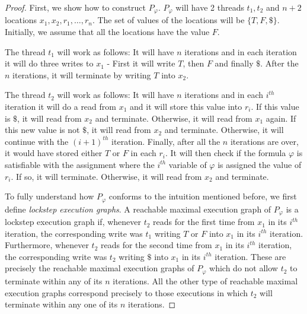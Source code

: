 \documentclass[acmsmall]{acmart}
\begin{document}
\begin{proof}
    First, we show how to construct $P_\varphi$. $P_\varphi$ will have 2 threads $t_1, t_2$
    and $n+2$ locations $x_1,x_2,r_1,\dots,r_n$. The set of values of the locations will be $\{T,F,\$\}$. Initially, we assume that all the locations have the value $F$.

    The thread $t_1$ will work as follows: It will have $n$ iterations
    and in each iteration it will do three writes to $x_1$ - First it
    will write $T$, then $F$ and finally $\$$.
    After the $n$ iterations, it will terminate by writing $T$ into $x_2$. 
    
    The thread $t_2$ will work as follows: It will have $n$ iterations and in each $i^{th}$ iteration it will do a read from $x_1$ and it will store this value into $r_i$. If this value is $\$$, it will read from $x_2$ and terminate.
    Otherwise, it will read from $x_1$ again. If this new value is not $\$$, it will
    read from $x_2$ and terminate. Otherwise, it will continue with the $(i+1)^{th}$ iteration. 
    Finally, after all the $n$ iterations are over, it would have stored either $T$ or $F$
    in each $r_i$. It will then check if the formula $\varphi$ is satisfiable
    with the assignment where the $i^{th}$ variable of $\varphi$ is assigned the value of $r_i$. If so,
    it will terminate. Otherwise, it will read from $x_2$ and terminate.

    To fully understand how $P_\varphi$ conforms to the intuition mentioned before,
    we first define \emph{lockstep execution graphs}. A reachable maximal execution graph of $P_\varphi$ is a lockstep execution graph if, whenever $t_2$ reads for the first time from $x_1$ in its $i^{th}$ iteration, the corresponding write was $t_1$ writing $T$ or $F$ into $x_1$
    in its $i^{th}$ iteration. Furthermore, whenever $t_2$ reads for the second time from $x_1$ in its $i^{th}$ iteration, the corresponding write was $t_2$ writing $\$$ into $x_1$ in its $i^{th}$ iteration.
    These are precisely the reachable maximal execution graphs of $P_\varphi$ which do not allow $t_2$ to terminate within any of its $n$ iterations. 
    All the other type of reachable maximal execution graphs correspond precisely to those executions in which $t_2$ will terminate within any one of its $n$ iterations.


\end{proof}
\end{document}

